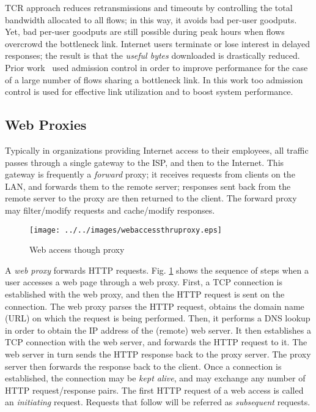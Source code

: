 \documentclass[conference]{../../IEEEtran}
\begin{document}
TCR approach reduces retransmissions and timeouts by controlling the total bandwidth allocated to all flows; in this way, it avoids bad per-user goodputs. Yet, bad per-user goodputs are still possible during peak hours when flows overcrowd the bottleneck link. Internet users terminate or lose interest in delayed responses; the result is that the \emph{useful bytes} downloaded is drastically reduced. Prior work~\cite{references:banchs02}\cite{references:kumar}\cite{references:mortier00} used admission control in order to improve performance for the case of a large number of flows sharing a bottleneck link. In this work too admission control is used for effective link utilization and to boost system performance.

\subsection{Web Proxies}
Typically in organizations providing Internet access to their employees, all traffic passes through a single gateway to the ISP, and then to the Internet. This gateway is frequently a \emph{forward} proxy; it receives requests from clients on the LAN, and forwards them to the remote server; responses sent back from the remote server to the proxy are then returned to the client. The forward proxy may filter/modify requests and cache/modify responses.

\begin{figure}[hbt]
\centering
  \texttt{[image: ../../images/webaccessthruproxy.eps]}
 \caption{Web access though proxy}
\label{fig:webaccthruproxy}
\end{figure}

A \emph{web proxy} forwards HTTP requests. Fig. \ref{fig:webaccthruproxy} shows the sequence of steps when a user accesses a web page through a web proxy. First, a TCP connection is established with the web proxy, and then the HTTP request is sent on the connection. The web proxy parses the HTTP request, obtains the domain name (URL) on which the request is being performed. Then, it performs a DNS lookup in order to obtain the IP address of the (remote) web server. It then establishes a TCP connection with the web server, and forwards the HTTP request to it. The web server in turn sends the HTTP response back to the proxy server. The proxy server then forwards the response back to the client. Once a connection is established, the connection may be \emph{kept alive}, and may exchange any number of HTTP request/response pairs. The first HTTP request of a web access is called an \emph{initiating} request. Requests that follow will be referred as \emph{subsequent} requests.
\end{document}
